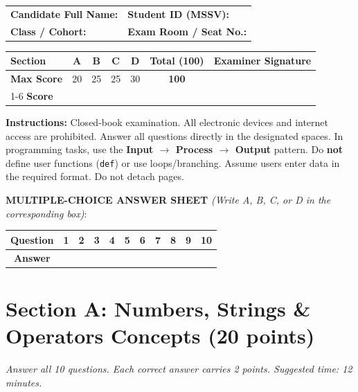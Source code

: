 \documentclass[11pt,a4paper]{article}
\begin{document}
\begin{headerbox}
\begin{tabular*}{\textwidth}{@{\extracolsep{\fill}}ll@{}}
  \textbf{Candidate Full Name:} \dotfill & \textbf{Student ID (MSSV):} \dotfill \\[0.25em]
  \textbf{Class / Cohort:} \dotfill & \textbf{Exam Room / Seat No.:} \dotfill
\end{tabular*}

\vspace{0.25em}
\renewcommand{\arraystretch}{1.1}
\setlength{\tabcolsep}{4.5pt}
\centering
\begin{tabular}{|l|c|c|c|c||c|c|}
\hline
\textbf{Section} & \textbf{A} & \textbf{B} & \textbf{C} & \textbf{D} & \textbf{Total (100)} & \textbf{Examiner Signature} \\
\hline
\textbf{Max Score} & 20 & 25 & 25 & 30 & \textbf{100} & \\[0.35em]
\cline{1-6}
\textbf{Score} & & & & & & \\[0.45em]
\hline
\end{tabular}

\vspace{0.2em}
\raggedright
\scriptsize
\textbf{Instructions:} Closed-book examination. All electronic devices and internet access are prohibited. Answer all questions directly in the designated spaces. In programming tasks, use the \textbf{Input $\rightarrow$ Process $\rightarrow$ Output} pattern. Do \textbf{not} define user functions (\texttt{def}) or use loops/branching. Assume users enter data in the required format. Do not detach pages.
\end{headerbox}

\vspace{1mm}
\noindent
\textbf{MULTIPLE-CHOICE ANSWER SHEET} \textit{(Write A, B, C, or D in the corresponding box)}:
\begin{center}
\setlength{\tabcolsep}{5pt}
\renewcommand{\arraystretch}{1.05}
\begin{tabular}{|c|c|c|c|c|c|c|c|c|c|c|}
\hline
\textbf{Question} & \textbf{1} & \textbf{2} & \textbf{3} & \textbf{4} & \textbf{5} & \textbf{6} & \textbf{7} & \textbf{8} & \textbf{9} & \textbf{10} \\
\hline
\textbf{Answer} & & & & & & & & & & \\[2mm]
\hline
\end{tabular}
\end{center}
\vspace{-2mm}
\section*{Section A: Numbers, Strings \& Operators Concepts \hfill \normalsize\normalfont(20 points)}
\textit{Answer all 10 questions. Each correct answer carries 2 points. Suggested time: 12 minutes.}
\end{document}
